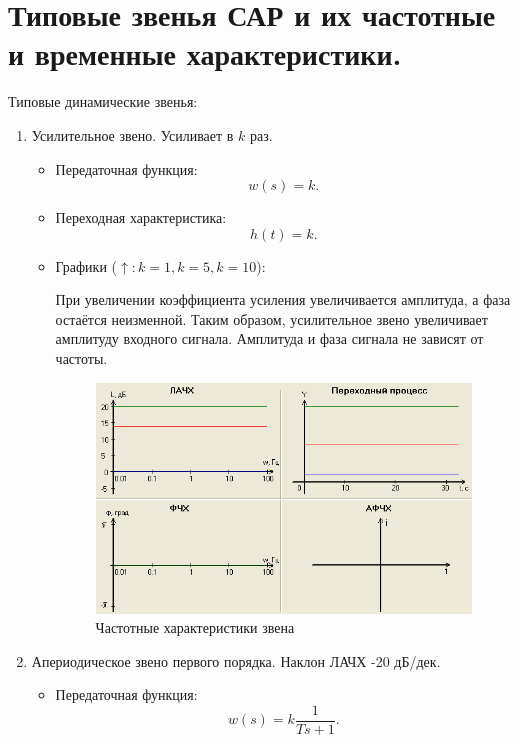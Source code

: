 \documentclass[unicode, 12pt, a4paper, oneside]{article}
\begin{document}
\section{Типовые звенья САР и их частотные и временные характеристики.}

Типовые динамические звенья:
\begin{enumerate}
\item Усилительное звено. Усиливает в $ k $ раз.
	\begin{itemize}
	\item Передаточная функция:
		\begin{equation}
		w(s) = k.
		\end{equation}
	
	\item Переходная характеристика:
		\begin{equation}
		h(t) = k.
		\end{equation}

	\item Графики ($ \uparrow : k = 1, k = 5, k = 10 $):
	
	При увеличении коэффициента усиления увеличивается амплитуда, а фаза остаётся неизменной. Таким образом, усилительное звено увеличивает амплитуду входного сигнала. Амплитуда и фаза сигнала не зависят от частоты.
	
		\begin{figure}[H]
		\centering
		\includegraphics[width=0.7\linewidth]{25_usil.png}
		\caption{Частотные характеристики звена}
		\end{figure}
	\end{itemize}


\item Апериодическое звено первого порядка. Наклон ЛАЧХ -20 дБ/дек.
	\begin{itemize}
	\item Передаточная функция:
		\begin{equation}
		w(s) = k \dfrac{1}{Ts + 1}.
		\end{equation}
	

\end{itemize}
\end{enumerate}
\end{document}
